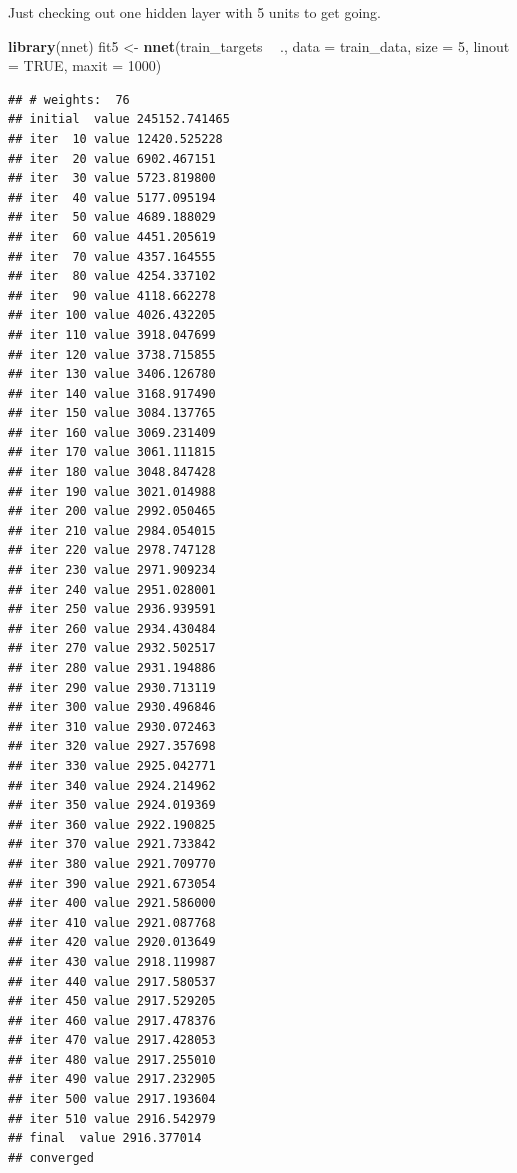 \documentclass[10pt,ignorenonframetext,]{beamer}
\newenvironment{Shaded}{\begin{snugshade}}{\end{snugshade}}
\newcommand{\KeywordTok}[1]{\textcolor[rgb]{0.13,0.29,0.53}{\textbf{#1}}}
\newcommand{\DataTypeTok}[1]{\textcolor[rgb]{0.13,0.29,0.53}{#1}}
\newcommand{\DecValTok}[1]{\textcolor[rgb]{0.00,0.00,0.81}{#1}}
\newcommand{\StringTok}[1]{\textcolor[rgb]{0.31,0.60,0.02}{#1}}
\newcommand{\OtherTok}[1]{\textcolor[rgb]{0.56,0.35,0.01}{#1}}
\newcommand{\OperatorTok}[1]{\textcolor[rgb]{0.81,0.36,0.00}{\textbf{#1}}}
\newcommand{\NormalTok}[1]{#1}
\begin{document}
\begin{frame}[fragile]

Just checking out one hidden layer with 5 units to get going.

\begin{Shaded}
\begin{Highlighting}[]
\KeywordTok{library}\NormalTok{(nnet)}
\NormalTok{fit5 <-}\StringTok{ }\KeywordTok{nnet}\NormalTok{(train_targets }\OperatorTok{~}\StringTok{ }\NormalTok{., }\DataTypeTok{data =}\NormalTok{ train_data, }\DataTypeTok{size =} \DecValTok{5}\NormalTok{, }\DataTypeTok{linout =} \OtherTok{TRUE}\NormalTok{, }
    \DataTypeTok{maxit =} \DecValTok{1000}\NormalTok{)}
\end{Highlighting}
\end{Shaded}

\begin{verbatim}
## # weights:  76
## initial  value 245152.741465 
## iter  10 value 12420.525228
## iter  20 value 6902.467151
## iter  30 value 5723.819800
## iter  40 value 5177.095194
## iter  50 value 4689.188029
## iter  60 value 4451.205619
## iter  70 value 4357.164555
## iter  80 value 4254.337102
## iter  90 value 4118.662278
## iter 100 value 4026.432205
## iter 110 value 3918.047699
## iter 120 value 3738.715855
## iter 130 value 3406.126780
## iter 140 value 3168.917490
## iter 150 value 3084.137765
## iter 160 value 3069.231409
## iter 170 value 3061.111815
## iter 180 value 3048.847428
## iter 190 value 3021.014988
## iter 200 value 2992.050465
## iter 210 value 2984.054015
## iter 220 value 2978.747128
## iter 230 value 2971.909234
## iter 240 value 2951.028001
## iter 250 value 2936.939591
## iter 260 value 2934.430484
## iter 270 value 2932.502517
## iter 280 value 2931.194886
## iter 290 value 2930.713119
## iter 300 value 2930.496846
## iter 310 value 2930.072463
## iter 320 value 2927.357698
## iter 330 value 2925.042771
## iter 340 value 2924.214962
## iter 350 value 2924.019369
## iter 360 value 2922.190825
## iter 370 value 2921.733842
## iter 380 value 2921.709770
## iter 390 value 2921.673054
## iter 400 value 2921.586000
## iter 410 value 2921.087768
## iter 420 value 2920.013649
## iter 430 value 2918.119987
## iter 440 value 2917.580537
## iter 450 value 2917.529205
## iter 460 value 2917.478376
## iter 470 value 2917.428053
## iter 480 value 2917.255010
## iter 490 value 2917.232905
## iter 500 value 2917.193604
## iter 510 value 2916.542979
## final  value 2916.377014 
## converged
\end{verbatim}


\end{frame}
\end{document}
